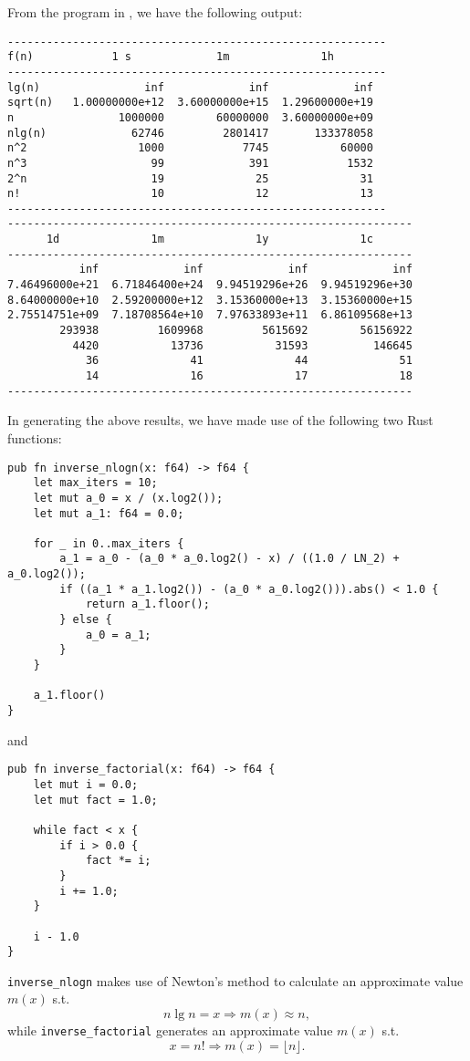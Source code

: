 
From the program in , we have the following
output:
\small\begin{verbatim}
----------------------------------------------------------
f(n)            1 s             1m              1h        
----------------------------------------------------------
lg(n)                inf             inf             inf  
sqrt(n)   1.00000000e+12  3.60000000e+15  1.29600000e+19  
n                1000000        60000000  3.60000000e+09  
nlg(n)             62746         2801417       133378058  
n^2                 1000            7745           60000  
n^3                   99             391            1532  
2^n                   19              25              31  
n!                    10              12              13  
----------------------------------------------------------
--------------------------------------------------------------
      1d              1m              1y              1c
--------------------------------------------------------------
           inf             inf             inf             inf
7.46496000e+21  6.71846400e+24  9.94519296e+26  9.94519296e+30
8.64000000e+10  2.59200000e+12  3.15360000e+13  3.15360000e+15
2.75514751e+09  7.18708564e+10  7.97633893e+11  6.86109568e+13
        293938         1609968         5615692        56156922
          4420           13736           31593          146645
            36              41              44              51
            14              16              17              18
--------------------------------------------------------------
\end{verbatim}\normalsize
\qquad In generating the above results, we have made use of the following two Rust functions:
\small\begin{verbatim}
pub fn inverse_nlogn(x: f64) -> f64 {
    let max_iters = 10;
    let mut a_0 = x / (x.log2());
    let mut a_1: f64 = 0.0;

    for _ in 0..max_iters {
        a_1 = a_0 - (a_0 * a_0.log2() - x) / ((1.0 / LN_2) + a_0.log2());
        if ((a_1 * a_1.log2()) - (a_0 * a_0.log2())).abs() < 1.0 {
            return a_1.floor();
        } else {
            a_0 = a_1;
        }
    }

    a_1.floor()
}
\end{verbatim}\normalsize
and 
\small\begin{verbatim}
pub fn inverse_factorial(x: f64) -> f64 {
    let mut i = 0.0;
    let mut fact = 1.0;

    while fact < x {
        if i > 0.0 {
            fact *= i;
        }
        i += 1.0;
    }

    i - 1.0
}
\end{verbatim}\normalsize
\texttt{inverse\_nlogn} makes use of Newton's method to calculate an approximate 
value $m(x)$ s.t. 
\[
    n\lg{n} = x \Rightarrow m(x) \approx n, 
\]
while \texttt{inverse\_factorial} generates an approximate value $m(x)$ s.t. 
\[
    x = n! \Rightarrow m(x) = \lfloor n \rfloor. 
\]
